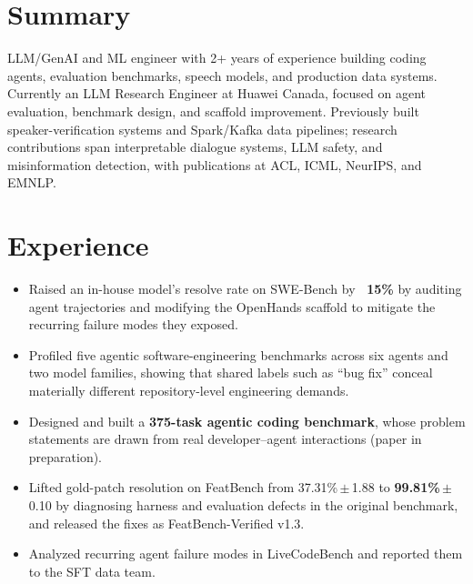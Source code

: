 \documentclass[11pt,letterpaper]{article}
\begin{document}
\datefooter


\section*{Summary}
LLM/GenAI and ML engineer with 2+ years of experience building coding agents, evaluation benchmarks, speech models, and production data systems. Currently an LLM Research Engineer at Huawei Canada, focused on agent evaluation, benchmark design, and scaffold improvement. Previously built speaker-verification systems and Spark/Kafka data pipelines; research contributions span interpretable dialogue systems, LLM safety, and misinformation detection, with publications at ACL, ICML, NeurIPS, and EMNLP.

\section*{Experience}

\begin{itemize}
  \item Raised an in-house model's resolve rate on SWE-Bench by \textbf{~15\%} by auditing agent trajectories and modifying the OpenHands scaffold to mitigate the recurring failure modes they exposed.
  \item Profiled five agentic software-engineering benchmarks across six agents and two model families, showing that shared labels such as “bug fix” conceal materially different repository-level engineering demands.
  \item Designed and built a \textbf{375-task agentic coding benchmark}, whose problem statements are drawn from real developer--agent interactions (paper in preparation).
  \item Lifted gold-patch resolution on FeatBench from 37.31\%\,{\footnotesize$\pm$\,1.88} to \textbf{99.81\%}\,{\footnotesize$\pm$\,0.10} by diagnosing harness and evaluation defects in the original benchmark, and released the fixes as FeatBench-Verified v1.3.
  \item Analyzed recurring agent failure modes in LiveCodeBench and reported them to the SFT data team.
\end{itemize}
\end{document}
